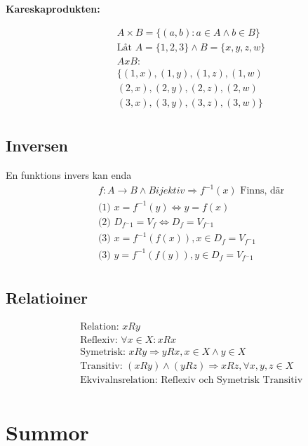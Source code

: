 \documentclass{article}
\begin{document}
\textbf{Kareskaprodukten:}\par
\begin{align*}
  &\quad  A \times B = \{ (a,b): a \in A \land b \in B \} \\
  &\quad  \text{Låt } A = \{ 1,2,3 \} \land B = \{ x,y,z,w \} \\
  &\quad  A x B : \\
  &\quad  \{ (1,x), (1,y), (1,z), (1,w) \\
  &\quad  (2,x), (2,y), (2,z), (2,w) \\
  &\quad  (3,x), (3,y), (3,z), (3,w) \} \\
\end{align*}

\subsection{Inversen}
En funktions invers kan enda
\begin{align*}
  &\quad  f: A \to B \land Bijektiv \Rightarrow f^{-1}(x) \text{ Finns, där}  \\
  &\quad \text{(1) }  x = f^{-1}(y) \Leftrightarrow y = f(x) \\
  &\quad \text{(2) }  D_{f^-1} = V_f \Leftrightarrow D_f = V_{f^-1} \\
  &\quad \text{(3) }  x = f^{-1}(f(x)), x \in D_f = V_{f^-1} \\ 
  &\quad \text{(3) }  y = f^{-1}(f(y)), y \in D_f = V_{f^-1} \\ 
\end{align*}

\subsection{Relatioiner}
\begin{align*}
  &\quad  \text{Relation: } xRy \\
  &\quad  \text{Reflexiv: } \forall x \in X: xRx \\
  &\quad  \text{Symetrisk: } xRy \Rightarrow yRx, x \in X \land y \in X \\
  &\quad  \text{Transitiv: } (xRy) \land (yRz) \Rightarrow xRz, \forall x,y,z \in X  \\
  &\quad  \text{Ekvivalnsrelation: Reflexiv och Symetrisk Transitiv} \\
\end{align*}


\newpage

\section{Summor}
\end{document}
